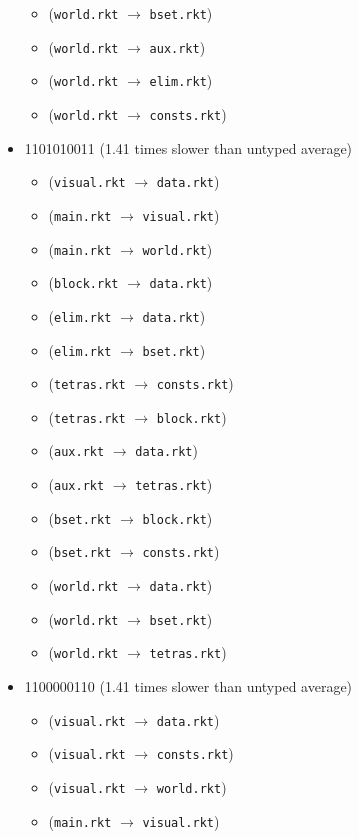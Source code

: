 \documentclass{article}
\newcommand{\mono}[1]{\texttt{#1}}
\begin{document}
\begin{itemize}
\begin{itemize}
  \item (\mono{world.rkt} $\rightarrow$ \mono{bset.rkt})
  \item (\mono{world.rkt} $\rightarrow$ \mono{aux.rkt})
  \item (\mono{world.rkt} $\rightarrow$ \mono{elim.rkt})
  \item (\mono{world.rkt} $\rightarrow$ \mono{consts.rkt})
  \end{itemize}
\item 1101010011 (1.41 times slower than untyped average)
  \begin{itemize}
  \item (\mono{visual.rkt} $\rightarrow$ \mono{data.rkt})
  \item (\mono{main.rkt} $\rightarrow$ \mono{visual.rkt})
  \item (\mono{main.rkt} $\rightarrow$ \mono{world.rkt})
  \item (\mono{block.rkt} $\rightarrow$ \mono{data.rkt})
  \item (\mono{elim.rkt} $\rightarrow$ \mono{data.rkt})
  \item (\mono{elim.rkt} $\rightarrow$ \mono{bset.rkt})
  \item (\mono{tetras.rkt} $\rightarrow$ \mono{consts.rkt})
  \item (\mono{tetras.rkt} $\rightarrow$ \mono{block.rkt})
  \item (\mono{aux.rkt} $\rightarrow$ \mono{data.rkt})
  \item (\mono{aux.rkt} $\rightarrow$ \mono{tetras.rkt})
  \item (\mono{bset.rkt} $\rightarrow$ \mono{block.rkt})
  \item (\mono{bset.rkt} $\rightarrow$ \mono{consts.rkt})
  \item (\mono{world.rkt} $\rightarrow$ \mono{data.rkt})
  \item (\mono{world.rkt} $\rightarrow$ \mono{bset.rkt})
  \item (\mono{world.rkt} $\rightarrow$ \mono{tetras.rkt})
  \end{itemize}
\item 1100000110 (1.41 times slower than untyped average)
  \begin{itemize}
  \item (\mono{visual.rkt} $\rightarrow$ \mono{data.rkt})
  \item (\mono{visual.rkt} $\rightarrow$ \mono{consts.rkt})
  \item (\mono{visual.rkt} $\rightarrow$ \mono{world.rkt})
  \item (\mono{main.rkt} $\rightarrow$ \mono{visual.rkt})

\end{itemize}
\end{itemize}
\end{document}

